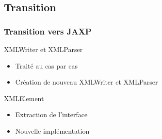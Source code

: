 \subsection{Transition}
\begin{frame}
\frametitle{Transition vers JAXP}
\begin{minipage}[c]{\linewidth}
	\begin{beamerboxesrounded}[shadow=true]{XMLWriter et XMLParser}
		\begin{itemize}
			\item Traité au cas par cas
			\item Création de nouveau XMLWriter et XMLParser
		\end{itemize}
	\end{beamerboxesrounded}
\end{minipage}
\vfill
\begin{minipage}[c]{\linewidth}
	\begin{beamerboxesrounded}[shadow=true]{XMLElement}
		\begin{itemize}
			\item Extraction de l'interface
			\item Nouvelle implémentation
		\end{itemize}
	\end{beamerboxesrounded}
\end{minipage}
\vfill
\end{frame}
